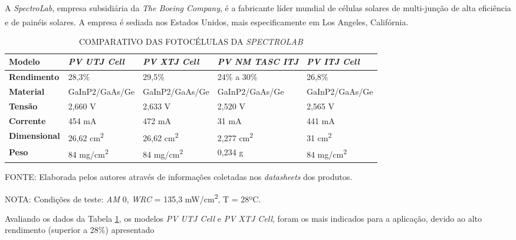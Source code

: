 \documentclass[
	12pt,				%
	openright,			%
	oneside,			%
	a4paper,			%
	english,			%
	french,				%
	spanish,			%
	brazil,				%
	oldfontcommands
	]{abntex2}
\begin{document}
	A \textit{SpectroLab}, empresa subsidiária da \textit{The Boeing Company}, é a fabricante líder mundial de células solares de multi-junção de alta eficiência e de painéis solares. A empresa é sediada nos Estados Unidos, mais especificamente em Los Angeles, Califórnia.\textsuperscript{\cite{SpectroLab}}
	
	\begin{table}[th]
	\caption{COMPARATIVO DAS FOTOCÉLULAS DA \textit{SPECTROLAB}}
	\label{Tab_Spectro_Comp}
	\begin{tabular}{p{2.5cm}|p{3.1cm}|p{3.1cm}|p{3.1cm}|p{3.1cm}}
		\textbf{Modelo} & \textit{\textbf{PV UTJ Cell}} & \textit{\textbf{PV XTJ Cell}} & \textit{\textbf{PV NM TASC ITJ}} & \textit{\textbf{PV ITJ Cell}} \\
		\hline
		\textbf{Rendimento} & 28,3\% & 29,5\% & 24\% a 30\% & 26,8\% \\
		\hline
		\textbf{Material} & GaInP2/GaAs/Ge & GaInP2/GaAs/Ge & GaInP2/GaAs/Ge & GaInP2/GaAs/Ge\\
		\hline
		\textbf{Tensão} & 2,660 V & 2,633 V & 2,520 V & 2,565 V\\
		\hline
		\textbf{Corrente} & 454 mA & 472 mA & 31 mA & 441 mA\\
		\hline
		\textbf{Dimensional} & 26,62 cm\textsuperscript{2} & 26,62 cm\textsuperscript{2} & 2,277 cm\textsuperscript{2} & 31 cm\textsuperscript{2}\\
		\hline
		\textbf{Peso} & 84 mg/cm\textsuperscript{2} & 84 mg/cm\textsuperscript{2} & 0,234 g & 84 mg/cm\textsuperscript{2}\\
	\end{tabular}
	
	\begin{small}
	\vspace{3pt}
		FONTE: Elaborada pelos autores através de informações coletadas nos \textit{datasheets} dos produtos.
	\end{small}
	\begin{footnotesize}
		NOTA: Condições de teste: \textit{AM} 0, \textit{WRC} = 135,3 mW/cm\textsuperscript{2}, T = 28ºC.
	\end{footnotesize}
	\end{table}

	Avaliando os dados da Tabela \ref{Tab_Spectro_Comp}, os modelos \textit{PV UTJ Cell} e \textit{PV XTJ Cell}, foram os mais indicados para a aplicação, devido ao alto rendimento (superior a 28\%) apresentado
	
\end{document}
